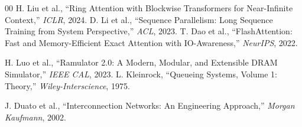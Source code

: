 \documentclass[10pt,conference]{IEEEtran}
\begin{document}
\begin{thebibliography}{00}
 H. Liu et al., ``Ring Attention with Blockwise Transformers for Near-Infinite Context,'' \textit{ICLR}, 2024.
 D. Li et al., ``Sequence Parallelism: Long Sequence Training from System Perspective,'' \textit{ACL}, 2023.
 T. Dao et al., ``FlashAttention: Fast and Memory-Efficient Exact Attention with IO-Awareness,'' \textit{NeurIPS}, 2022.

 H. Luo et al., ``Ramulator 2.0: A Modern, Modular, and Extensible DRAM Simulator,'' \textit{IEEE CAL}, 2023.
 L. Kleinrock, ``Queueing Systems, Volume 1: Theory,'' \textit{Wiley-Interscience}, 1975.

 J. Duato et al., ``Interconnection Networks: An Engineering Approach,'' \textit{Morgan Kaufmann}, 2002.
\end{thebibliography}
\end{document}
